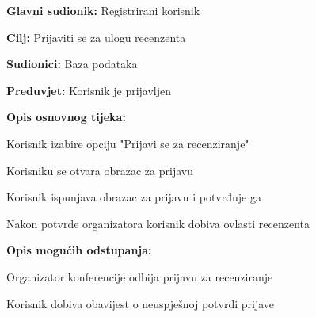 	\noindent {}
	\begin{packed_item}
		
		\item \textbf{Glavni sudionik: }Registrirani korisnik
		\item  \textbf{Cilj:} Prijaviti se za ulogu recenzenta
		\item  \textbf{Sudionici:} Baza podataka
		\item  \textbf{Preduvjet:} Korisnik je prijavljen
		\item  \textbf{Opis osnovnog tijeka:}
		
		\item[] \begin{packed_enum}
			
			\item  Korisnik izabire opciju "Prijavi se za recenziranje"
			\item Korisniku se otvara obrazac za prijavu
			\item Korisnik ispunjava obrazac za prijavu i potvrđuje ga
			\item Nakon potvrde organizatora korisnik dobiva ovlasti recenzenta
			
		\end{packed_enum}
		
		\item  \textbf{Opis mogućih odstupanja:}
		
		\item[] \begin{packed_item}
			
			\item[4.a] Organizator konferencije odbija prijavu za recenziranje
			\item[] \begin{packed_enum}
				
				\item Korisnik dobiva obavijest o neuspješnoj potvrdi prijave
				
			\end{packed_enum}
		\end{packed_item}
	\end{packed_item}

